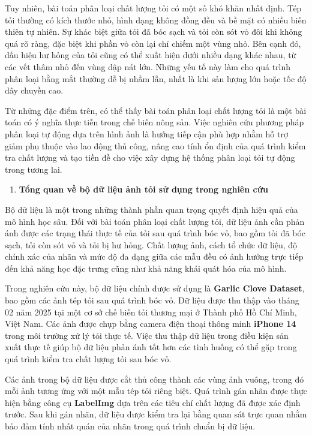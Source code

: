 \documentclass[
]{article}
\begin{document}
Tuy nhiên, bài toán phân loại chất lượng tỏi có một số khó khăn nhất
định. Tép tỏi thường có kích thước nhỏ, hình dạng không đồng đều và bề
mặt có nhiều biến thiên tự nhiên. Sự khác biệt giữa tỏi đã bóc sạch và
tỏi còn sót vỏ đôi khi không quá rõ ràng, đặc biệt khi phần vỏ còn lại
chỉ chiếm một vùng nhỏ. Bên cạnh đó, dấu hiệu hư hỏng của tỏi cũng có
thể xuất hiện dưới nhiều dạng khác nhau, từ các vết thâm nhỏ đến vùng
dập nát lớn. Những yếu tố này làm cho quá trình phân loại bằng mắt
thường dễ bị nhầm lẫn, nhất là khi sản lượng lớn hoặc tốc độ dây chuyền
cao.

Từ những đặc điểm trên, có thể thấy bài toán phân loại chất lượng tỏi là
một bài toán có ý nghĩa thực tiễn trong chế biến nông sản. Việc nghiên
cứu phương pháp phân loại tự động dựa trên hình ảnh là hướng tiếp cận
phù hợp nhằm hỗ trợ giảm phụ thuộc vào lao động thủ công, nâng cao tính
ổn định của quá trình kiểm tra chất lượng và tạo tiền đề cho việc xây
dựng hệ thống phân loại tỏi tự động trong tương lai.

\begin{enumerate}
\def\labelenumi{\arabic{enumi}.}
\setcounter{enumi}{1}
\item
  \protect{}\label{_Toc232111998}{}\textbf{Tổng quan về bộ
  dữ liệu ảnh tỏi sử dụng trong nghiên cứu}
\end{enumerate}

Bộ dữ liệu là một trong những thành phần quan trọng quyết định hiệu quả
của mô hình học sâu. Đối với bài toán phân loại chất lượng tỏi, dữ liệu
ảnh cần phản ánh được các trạng thái thực tế của tỏi sau quá trình bóc
vỏ, bao gồm tỏi đã bóc sạch, tỏi còn sót vỏ và tỏi bị hư hỏng. Chất
lượng ảnh, cách tổ chức dữ liệu, độ chính xác của nhãn và mức độ đa dạng
giữa các mẫu đều có ảnh hưởng trực tiếp đến khả năng học đặc trưng cũng
như khả năng khái quát hóa của mô hình.

Trong nghiên cứu này, bộ dữ liệu chính được sử dụng là \textbf{Garlic
Clove Dataset}, bao gồm các ảnh tép tỏi sau quá trình bóc vỏ. Dữ liệu
được thu thập vào tháng 02 năm 2025 tại một cơ sở chế biến tỏi thương
mại ở Thành phố Hồ Chí Minh, Việt Nam. Các ảnh được chụp bằng camera
điện thoại thông minh \textbf{iPhone 14} trong môi trường xử lý tỏi thực
tế. Việc thu thập dữ liệu trong điều kiện sản xuất thực tế giúp bộ dữ
liệu phản ánh tốt hơn các tình huống có thể gặp trong quá trình kiểm tra
chất lượng tỏi sau bóc vỏ.

Các ảnh trong bộ dữ liệu được cắt thủ công thành các vùng ảnh vuông,
trong đó mỗi ảnh tương ứng với một mẫu tép tỏi riêng biệt. Quá trình gán
nhãn được thực hiện bằng công cụ \textbf{LabelImg} dựa trên các tiêu chí
chất lượng đã được xác định trước. Sau khi gán nhãn, dữ liệu được kiểm
tra lại bằng quan sát trực quan nhằm bảo đảm tính nhất quán của nhãn
trong quá trình chuẩn bị dữ liệu.
\end{document}

